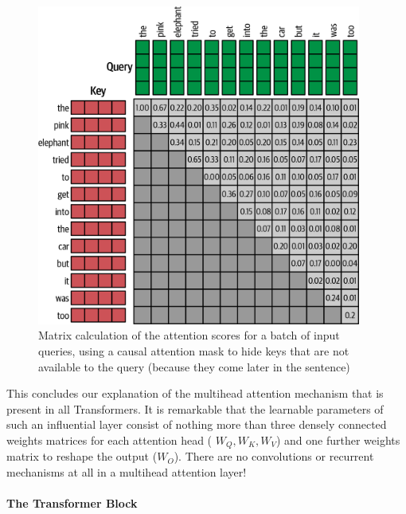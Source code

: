 \begin{figure}
	\begin{center}
		\includegraphics[width=0.95\textwidth]{figures/causal_mask}
	\end{center}
	\caption{Matrix calculation of the attention scores for a batch of input queries, using a causal attention mask to hide keys that are not available to the query (because they come later in the sentence)}\label{fig:causal_mask}
\end{figure}

This concludes our explanation of the multihead attention mechanism that is present in all Transformers.
It is remarkable that the learnable parameters of such an influential layer consist of nothing more than three densely connected weights matrices for each attention head ( \( W_Q, W_K, W_V \)) and one further weights matrix to reshape the output (\( W_O \)).
There are no convolutions or recurrent mechanisms at all in a multihead attention layer!

\paragraph{The Transformer Block~}

